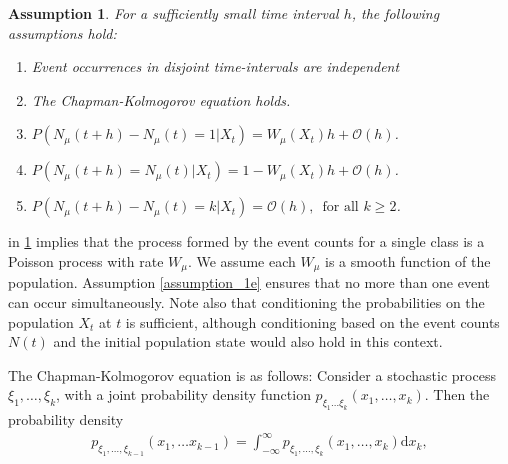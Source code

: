 \documentclass[10pt,a4paper]{article}
\newtheorem{assumption}{Assumption}
\begin{document}
\begin{assumption} For a sufficiently small time interval $h$, the following assumptions hold:
	\begin{enumerate}
		\item Event occurrences in disjoint time-intervals are independent \label{assumption_1a}

		\item The Chapman-Kolmogorov equation \cite{Kolmogoroff1931,Feller1940} holds.  \label{assumption_1b}

		\item $P\left( N_{\mu} \left( t  + h \right)  - N_{\mu} \left( t \right) = 1 | X_t \right) = W_{\mu} \left( X_t \right) h + \mathcal{O} \left( h \right)$. \label{assumption_1c}
	
		\item $P\left( N_{\mu}\left( t+h\right) = N_{\mu} \left( t \right) | X_t \right) = 1-W_{\mu}\left( X_t \right) h + \mathcal{O}\left( h \right)$. \label{assumption_1d}

		\item $P\left( N_{\mu}\left( t + h \right ) - N_{\mu} \left( t \right) = k | X_t \right)= \mathcal{O}\left( h \right) , \, \textrm{ for all } k \geq 2$. \label{assumption_1e}
	\end{enumerate} \label{assumption_1}
\end{assumption}

 in \cref{assumption_1} implies that the process formed by the event counts for a single class is a Poisson process with rate $W_{\mu}$. We assume each $W_{\mu}$ is a smooth function of the population. Assumption \ref{assumption_1e} ensures that no more than one event can occur simultaneously. Note also that conditioning the probabilities on the population $X_t$ at $t$ is sufficient, although conditioning based on the event counts $N\left( t \right)$ and the initial population state would also hold in this context.


The Chapman-Kolmogorov equation is as follows: Consider a stochastic process $\xi_1, \ldots, \xi_k$, with a joint probability density function $p_{\xi_1 \ldots \xi_k} \left( x_1, \ldots, x_k \right)$. Then the probability density
\begin{align*}
p_{\xi_1, \ldots, \xi_ {k-1}} \left( x_1, \ldots x_{k-1} \right) = \int_{-\infty}^\infty p_{\xi_1, \ldots, \xi_k}\left( x_1, \ldots, x_k \right) \mathrm{d} x_k,
\end{align*}
\end{document}
